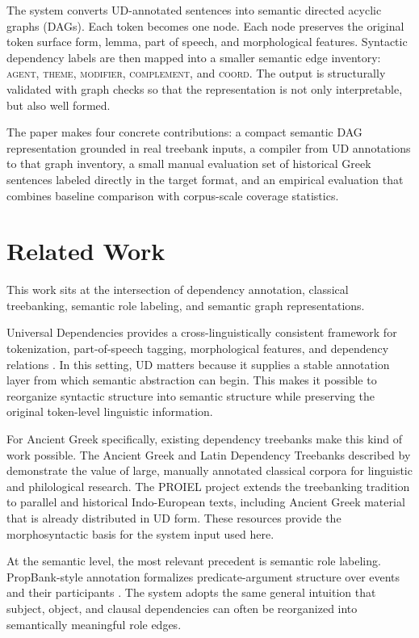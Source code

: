 \documentclass[11pt]{article}
\begin{document}
The system converts UD-annotated sentences into semantic directed acyclic graphs
(DAGs). Each token becomes one node. Each node preserves the original token
surface form, lemma, part of speech, and morphological features. Syntactic
dependency labels are then mapped into a smaller semantic edge inventory:
\textsc{agent}, \textsc{theme}, \textsc{modifier}, \textsc{complement}, and
\textsc{coord}. The output is structurally validated with graph checks so that
the representation is not only interpretable, but also well formed.

The paper makes four concrete contributions: a compact semantic DAG
representation grounded in real treebank inputs, a compiler from UD annotations
to that graph inventory, a small manual evaluation set of historical Greek
sentences labeled directly in the target format, and an empirical evaluation
that combines baseline comparison with corpus-scale coverage statistics.

\section{Related Work}
This work sits at the intersection of dependency annotation, classical
treebanking, semantic role labeling, and semantic graph representations.

Universal Dependencies provides a cross-linguistically consistent framework for
tokenization, part-of-speech tagging, morphological features, and dependency
relations \citep{nivre2016ud}. In this setting, UD matters because it supplies a
stable annotation layer from which semantic abstraction can begin. This makes it
possible to reorganize syntactic structure into semantic structure while preserving
the original token-level linguistic information.

For Ancient Greek specifically, existing dependency treebanks make this kind of
work possible. The Ancient Greek and Latin Dependency Treebanks described by
\citet{bamman2011agldt} demonstrate the value of large, manually annotated
classical corpora for linguistic and philological research. The PROIEL project
\citep{haug2008proiel} extends the treebanking tradition to parallel and
historical Indo-European texts, including Ancient Greek material that is already
distributed in UD form. These resources provide the morphosyntactic basis for
the system input used here.

At the semantic level, the most relevant precedent is semantic role labeling.
PropBank-style annotation formalizes predicate-argument structure over events and
their participants \citep{palmer2005propbank}. The system adopts the
same general intuition that subject, object, and clausal dependencies can often
be reorganized into semantically meaningful role edges.
\end{document}
